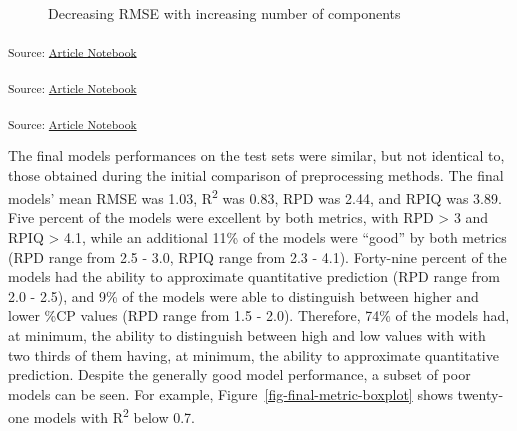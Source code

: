 \documentclass[
]{agujournal2019}
\begin{document}
\label{cell-fig-model-calibration}
\begin{figure}[H]


\caption{\label{fig-model-calibration}Decreasing RMSE with increasing
number of components}

\end{figure}%

\textsubscript{Source:
\href{https://rvcrawford.github.io/glowing-system/index.qmd.html}{Article
Notebook}}

\textsubscript{Source:
\href{https://rvcrawford.github.io/glowing-system/index.qmd.html}{Article
Notebook}}

\textsubscript{Source:
\href{https://rvcrawford.github.io/glowing-system/index.qmd.html}{Article
Notebook}}

The final models performances on the test sets were similar, but not
identical to, those obtained during the initial comparison of
preprocessing methods. The final models' mean RMSE was 1.03,
R\textsuperscript{2} was 0.83, RPD was 2.44, and RPIQ was 3.89. Five
percent of the models were excellent by both metrics, with RPD
\textgreater{} 3 and RPIQ \textgreater{} 4.1, while an additional 11\%
of the models were ``good'' by both metrics (RPD range from 2.5 - 3.0,
RPIQ range from 2.3 - 4.1). Forty-nine percent of the models had the
ability to approximate quantitative prediction (RPD range from 2.0 -
2.5), and 9\% of the models were able to distinguish between higher and
lower \%CP values (RPD range from 1.5 - 2.0). Therefore, 74\% of the
models had, at minimum, the ability to distinguish between high and low
values with with two thirds of them having, at minimum, the ability to
approximate quantitative prediction. Despite the generally good model
performance, a subset of poor models can be seen. For example,
Figure~\ref{fig-final-metric-boxplot} shows twenty-one models with
R\textsuperscript{2} below 0.7.
\end{document}
